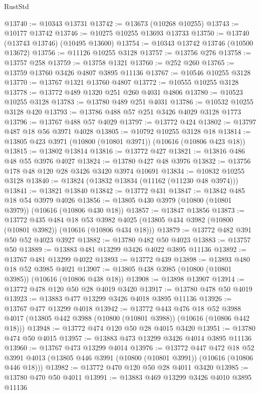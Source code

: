 \begin{lexlean}{RustStd}
\begin{coremodule}
@13740 := @10343 @13731
@13742 := @13673 (@10268 @10255)
@13743 := @10177 @13742
@13746 := @10275 @10255 @13693 @13733
@13750 := @13740 (@13743 @13746) (@10495 @13600)
@13754 := @10343 @13742 @13746 (@10500 @13672)
@13756 := @11126 @10255 @3128
@13757 := @13756 @276
@13758 := @13757 @258
@13759 := @13758 @1321
@13760 := @252 @260
@13765 := @13759 @13760 @3426 @4807 @3895 @11136
@13767 := @10546 @10255 @3128
@13770 := @13767 @1321 @13760 @4807
@13772 := @10555 @10255 @3128
@13778 := @13772 @489 @1320 @251 @260 @4031 @4806
@13780 := @10523 @10255 @3128
@13783 := @13780 @489 @251 @4031
@13786 := @10532 @10255 @3128 @420
@13793 := @13786 @488 @57 @251 @3426 @4029 @3128 @1773
@13796 := @13767 @488 @57 @4029
@13797 := @13772 @424
@13802 := @13797 @487 @18 @56 @3971 @4028
@13805 := @10792 @10255 @3128 @18
@13814 := @13805 @423 @3971 (@10800 (@10801 @3971)) (@10616 (@10806 @423 @18))
@13815 := @13802 @13814
@13816 := @13772 @427
@13821 := @13816 @486 @48 @55 @3976 @4027
@13824 := @13780 @427 @48 @3976
@13832 := @13756 @178 @48 @120 @28 @3426 @3420 @3974 @10691
@13834 := @10832 @10255 @3128
@13840 := @13824 (@13832 @13834 (@11162 (@11230 @48 @3974)))
@13841 := @13821 @13840
@13842 := @13772 @431
@13847 := @13842 @485 @18 @54 @3979 @4026
@13856 := @13805 @430 @3979 (@10800 (@10801 @3979)) (@10616 (@10806 @430 @18))
@13857 := @13847 @13856
@13873 := @13772
    @435
    @484
    @18
    @53
    @3982
    @4025
    (@13805 @434 @3982 (@10800 (@10801 @3982)) (@10616 (@10806 @434 @18)))
@13879 := @13772 @482 @391 @50 @52 @4023 @3927
@13882 := @13780 @482 @50 @4023
@13883 := @13757 @50
@13889 := @13883 @481 @13299 @3426 @4022 @3895 @11136
@13892 := @13767 @481 @13299 @4022
@13893 := @13772 @439
@13898 := @13893 @480 @18 @52 @3985 @4021
@13907 := @13805 @438 @3985 (@10800 (@10801 @3985)) (@10616 (@10806 @438 @18))
@13908 := @13898 @13907
@13914 := @13772 @478 @120 @50 @28 @4019 @3420
@13917 := @13780 @478 @50 @4019
@13923 := @13883 @477 @13299 @3426 @4018 @3895 @11136
@13926 := @13767 @477 @13299 @4018
@13942 := @13772
    @443
    @476
    @18
    @52
    @3988
    @4017
    (@13805 @442 @3988 (@10800 (@10801 @3988)) (@10616 (@10806 @442 @18)))
@13948 := @13772 @474 @120 @50 @28 @4015 @3420
@13951 := @13780 @474 @50 @4015
@13957 := @13883 @473 @13299 @3426 @4014 @3895 @11136
@13960 := @13767 @473 @13299 @4014
@13976 := @13772
    @447
    @472
    @18
    @52
    @3991
    @4013
    (@13805 @446 @3991 (@10800 (@10801 @3991)) (@10616 (@10806 @446 @18)))
@13982 := @13772 @470 @120 @50 @28 @4011 @3420
@13985 := @13780 @470 @50 @4011
@13991 := @13883 @469 @13299 @3426 @4010 @3895 @11136

\end{coremodule}
\end{lexlean}
